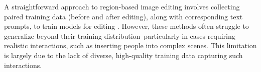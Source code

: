 \documentclass{article}
\newcommand{\kc}[1]{\textcolor{blue}{#1}}
\begin{document}






A straightforward approach to region-based image editing involves collecting paired training data (before and after editing), along with corresponding text prompts, to train models for editing \citep{brooks2023instructpix2pix, zhang2023magicbrush, wasserman2024paint, li2024brushedit, hui2024hq, wei2024omniedit}. However, these methods often struggle to generalize beyond their training distribution--particularly in cases requiring realistic interactions, such as inserting people into complex scenes. This limitation is largely due to the lack of diverse, high-quality training data capturing such interactions.
\end{document}
